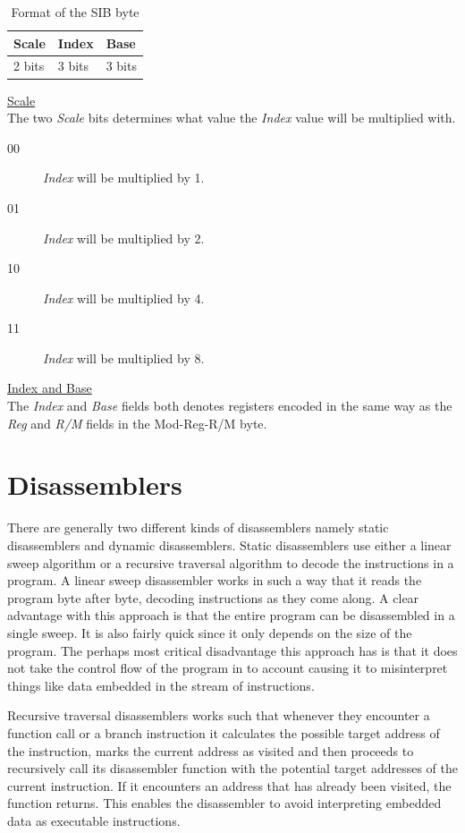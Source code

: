 \documentclass[11pt,twoside]{eitExjobb}
\begin{document}
\begin{table}[h]
\begin{tabular}{|l|l|l|}
\hline
Scale & Index & Base \\
\hline
2 bits & 3 bits & 3 bits \\
\hline
\end{tabular}
\caption{Format of the SIB byte}
\label{table:sibbyte}
\end{table}


\noindent \uline{Scale}\\
The two \emph{Scale} bits determines what value the \emph{Index} value will be multiplied with.\\
\begin{description}
\item[00] \emph{Index} will be multiplied by 1.  
\item[01] \emph{Index} will be multiplied by 2.
\item[10] \emph{Index} will be multiplied by 4.
\item[11] \emph{Index} will be multiplied by 8.
\end{description}

\noindent \uline{Index and Base}\\
The \emph{Index} and \emph{Base} fields both denotes registers encoded in the same way as the \emph{Reg} and \emph{R/M} fields in the Mod-Reg-R/M byte. \cite{bittwiddling}\cite{assemblylanguagex86}



\section{Disassemblers}
There are generally two different kinds of disassemblers namely static disassemblers and dynamic disassemblers. Static disassemblers use either a linear sweep algorithm or a recursive traversal algorithm to decode the instructions in a program. A linear sweep disassembler works in such a way that it reads the program byte after byte, decoding instructions as they come along. A clear advantage with this approach is that the entire program can be disassembled in a single sweep. It is also fairly quick since it only depends on the size of the program. The perhaps most critical disadvantage this approach has is that it does not take the control flow of the program in to account causing it to misinterpret things like data embedded in the stream of instructions.

Recursive traversal disassemblers works such that whenever they encounter a function call or a branch instruction it calculates the possible target address of the instruction, marks the current address as visited and then proceeds to recursively call its disassembler function with the potential target addresses of the current instruction. If it encounters an address that has already been visited, the function returns. This enables the disassembler to avoid interpreting embedded data as executable instructions.
\end{document}
